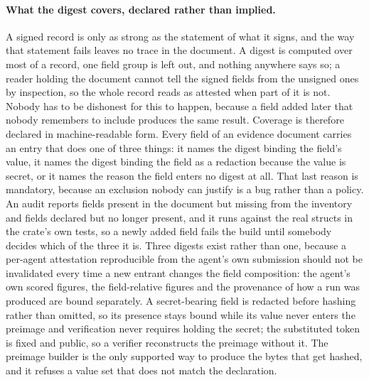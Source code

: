 \paragraph{What the digest covers, declared rather than implied.} A signed record is only as strong as the statement of what it signs, and the way that statement fails leaves no trace in the document. A digest is computed over most of a record, one field group is left out, and nothing anywhere says so; a reader holding the document cannot tell the signed fields from the unsigned ones by inspection, so the whole record reads as attested when part of it is not. Nobody has to be dishonest for this to happen, because a field added later that nobody remembers to include produces the same result. Coverage is therefore declared in machine-readable form. Every field of an evidence document carries an entry that does one of three things: it names the digest binding the field's value, it names the digest binding the field as a redaction because the value is secret, or it names the reason the field enters no digest at all. That last reason is mandatory, because an exclusion nobody can justify is a bug rather than a policy. An audit reports fields present in the document but missing from the inventory and fields declared but no longer present, and it runs against the real structs in the crate's own tests, so a newly added field fails the build until somebody decides which of the three it is. Three digests exist rather than one, because a per-agent attestation reproducible from the agent's own submission should not be invalidated every time a new entrant changes the field composition: the agent's own scored figures, the field-relative figures and the provenance of how a run was produced are bound separately. A secret-bearing field is redacted before hashing rather than omitted, so its presence stays bound while its value never enters the preimage and verification never requires holding the secret; the substituted token is fixed and public, so a verifier reconstructs the preimage without it. The preimage builder is the only supported way to produce the bytes that get hashed, and it refuses a value set that does not match the declaration.

